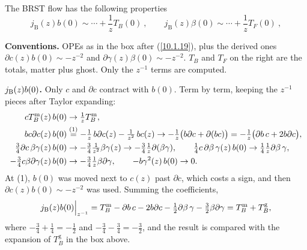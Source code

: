 	The BRST flow has the following properties
	\begin{equation}
		j_{\text{B}}(z)b(0)\sim \cdots + \frac{1}{z}T_{B}(0) \:, \qquad
		j_{\text{B}}(z)\beta(0) \sim \cdots +\frac{1}{z} T_{F}(0) \:, \label{10.5.22}
	\end{equation}
	\begin{tcolorbox}[breakable]
		\begin{remark}
			\textbf{Conventions.} OPEs as in the box after (\ref{10.1.19}), plus the derived ones $\partial c(z)b(0)\sim-z^{-2}$ and $\partial\gamma(z)\beta(0)\sim-z^{-2}$. $T_B$ and $T_F$ on the right are the totals, matter plus ghost. Only the $z^{-1}$ terms are computed.

			\textbf{$j_{\rm B}(z)b(0)$.} Only $c$ and $\partial c$ contract with $b(0)$. Term by term, keeping the $z^{-1}$ pieces after Taylor expanding:
			\begin{align*}
				cT^{\mathrm m}_B(z)\,b(0)&\to\tfrac1zT^{\mathrm m}_B,\\
				bc\partial c(z)\,b(0)&\overset{(1)}{=}-\tfrac1z\,b\partial c(z)-\tfrac1{z^{2}}\,bc(z)\to-\tfrac1z\bigl(b\partial c+\partial(bc)\bigr)=-\tfrac1z\bigl(\partial b\,c+2b\partial c\bigr),\\
				\tfrac34\partial c\,\beta\gamma(z)\,b(0)&\to-\tfrac34\tfrac1{z^{2}}\beta\gamma(z)\to-\tfrac34\tfrac1z\partial(\beta\gamma),\qquad
				\tfrac14c\,\partial\beta\,\gamma(z)\,b(0)\to\tfrac14\tfrac1z\partial\beta\,\gamma,\\
				-\tfrac34c\beta\partial\gamma(z)\,b(0)&\to-\tfrac34\tfrac1z\beta\partial\gamma,\qquad -b\gamma^{2}(z)\,b(0)\to0 .
			\end{align*}
			At (1), $b(0)$ was moved next to $c(z)$ past $\partial c$, which costs a sign, and then $\partial c(z)b(0)\sim-z^{-2}$ was used. Summing the coefficients,
			\begin{equation*}
				j_{\rm B}(z)b(0)\Big|_{z^{-1}}=T^{\mathrm m}_B-\partial b\,c-2b\partial c-\tfrac12\partial\beta\,\gamma-\tfrac32\beta\partial\gamma=T^{\mathrm m}_B+T^{\mathrm g}_B ,
			\end{equation*}
			where $-\tfrac34+\tfrac14=-\tfrac12$ and $-\tfrac34-\tfrac34=-\tfrac32$, and the result is compared with the expansion of $T^{\mathrm g}_B$ in the box above.


\end{remark}
\end{tcolorbox}
